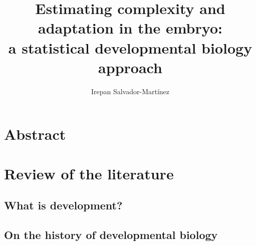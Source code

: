 \documentclass[officiallayout]{tktla_modified}
\title{Estimating complexity and adaptation 
in the embryo:
\\ a statistical developmental biology approach
}
\author{Irepan Salvador-Mart\'inez}
\begin{document}
\frontmatter

\maketitle
\makenomenclature

\begin{acknowledgements}
  
\end{acknowledgements}


\tableofcontents

\mainmatter





\printnomenclature


\chapter{Abstract}
	


\chapter{Review of the literature}


\section{What is development?}
	
\section{On the history of developmental biology}
	
	\clearpage 	
	
\end{document}
